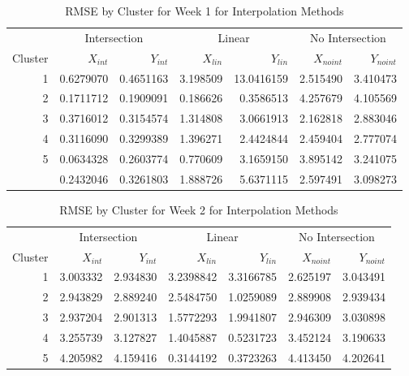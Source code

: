 \documentclass[12pt]{article}
\begin{document}
\begin{table}

\caption{\label{tab:results-clust1-actual}RMSE by Cluster for Week 1 for Interpolation Methods}
\centering
\begin{tabular}[t]{rrrrrrr}
\toprule
\multicolumn{1}{c}{ } & \multicolumn{2}{c}{Intersection} & \multicolumn{2}{c}{Linear} & \multicolumn{2}{c}{No Intersection} \\
\cmidrule(l{3pt}r{3pt}){2-3} \cmidrule(l{3pt}r{3pt}){4-5} \cmidrule(l{3pt}r{3pt}){6-7}
Cluster & $X_{int}$ & $Y_{int}$ & $X_{lin}$ & $Y_{lin}$ & $X_{noint}$ & $Y_{noint}$\\
\midrule
1 & 0.6279070 & 0.4651163 & 3.198509 & 13.0416159 & 2.515490 & 3.410473\\
2 & 0.1711712 & 0.1909091 & 0.186626 & 0.3586513 & 4.257679 & 4.105569\\
3 & 0.3716012 & 0.3154574 & 1.314808 & 3.0661913 & 2.162818 & 2.883046\\
4 & 0.3116090 & 0.3299389 & 1.396271 & 2.4424844 & 2.459404 & 2.777074\\
5 & 0.0634328 & 0.2603774 & 0.770609 & 3.1659150 & 3.895142 & 3.241075\\
\addlinespace
6 & 0.2432046 & 0.3261803 & 1.888726 & 5.6371115 & 2.597491 & 3.098273\\
\bottomrule
\end{tabular}
\end{table}

\begin{table}

\caption{\label{tab:results-clust2-actual}RMSE by Cluster for Week 2 for Interpolation Methods}
\centering
\begin{tabular}[t]{rrrrrrr}
\toprule
\multicolumn{1}{c}{ } & \multicolumn{2}{c}{Intersection} & \multicolumn{2}{c}{Linear} & \multicolumn{2}{c}{No Intersection} \\
\cmidrule(l{3pt}r{3pt}){2-3} \cmidrule(l{3pt}r{3pt}){4-5} \cmidrule(l{3pt}r{3pt}){6-7}
Cluster & $X_{int}$ & $Y_{int}$ & $X_{lin}$ & $Y_{lin}$ & $X_{noint}$ & $Y_{noint}$\\
\midrule
1 & 3.003332 & 2.934830 & 3.2398842 & 3.3166785 & 2.625197 & 3.043491\\
2 & 2.943829 & 2.889240 & 2.5484750 & 1.0259089 & 2.889908 & 2.939434\\
3 & 2.937204 & 2.901313 & 1.5772293 & 1.9941807 & 2.946309 & 3.030898\\
4 & 3.255739 & 3.127827 & 1.4045887 & 0.5231723 & 3.452124 & 3.190633\\
5 & 4.205982 & 4.159416 & 0.3144192 & 0.3723263 & 4.413450 & 4.202641\\
\bottomrule
\end{tabular}
\end{table}
\end{document}
